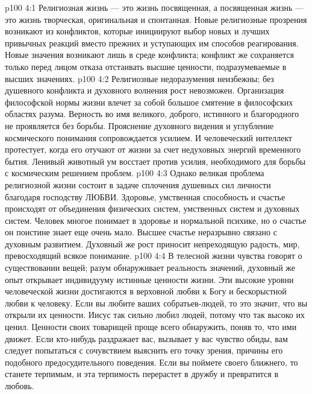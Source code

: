 \vs p100 4:1 Религиозная жизнь --- это жизнь посвященная, а посвященная жизнь --- это жизнь творческая, оригинальная и спонтанная. Новые религиозные прозрения возникают из конфликтов, которые инициируют выбор новых и лучших привычных реакций вместо прежних и уступающих им способов реагирования. Новые значения возникают лишь в среде конфликта; конфликт же сохраняется только перед лицом отказа отстаивать высшие ценности, подразумеваемые в высших значениях.
\vs p100 4:2 Религиозные недоразумения неизбежны; без душевного конфликта и духовного волнения рост невозможен. Организация философской нормы жизни влечет за собой большое смятение в философских областях разума. Верность во имя великого, доброго, истинного и благородного не проявляется без борьбы. Прояснение духовного видения и углубление космического понимания сопровождается усилием. И человеческий интеллект протестует, когда его отучают от жизни за счет недуховных энергий временного бытия. Ленивый животный ум восстает против усилия, необходимого для борьбы с космическим решением проблем.
\vs p100 4:3 Однако великая проблема религиозной жизни состоит в задаче сплочения душевных сил личности благодаря господству ЛЮБВИ. Здоровье, умственная способность и счастье происходят от объединения физических систем, умственных систем и духовных систем. Человек многое понимает в здоровье и нормальной психике, но о счастье он поистине знает еще очень мало. Высшее счастье неразрывно связано с духовным развитием. Духовный же рост приносит непреходящую радость, мир, превосходящий всякое понимание.
\vs p100 4:4 \pc В телесной жизни чувства говорят о существовании вещей; разум обнаруживает реальность значений, духовный же опыт открывает индивидууму истинные ценности жизни. Эти высокие уровни человеческой жизни достигаются в верховной любви к Богу и бескорыстной любви к человеку. Если вы любите ваших собратьев\hyp{}людей, то это значит, что вы открыли их ценности. Иисус так сильно любил людей, потому что так высоко их ценил. Ценности своих товарищей проще всего обнаружить, поняв то, что ими движет. Если кто\hyp{}нибудь раздражает вас, вызывает у вас чувство обиды, вам следует попытаться с сочувствием выяснить его точку зрения, причины его подобного предосудительного поведения. Если вы поймете своего ближнего, то станете терпимым, и эта терпимость перерастет в дружбу и превратится в любовь.
